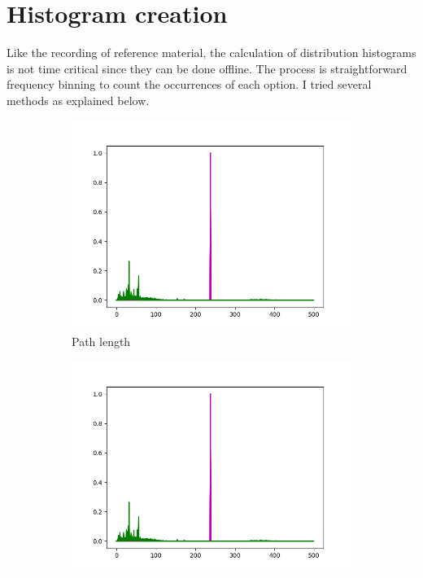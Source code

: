 \documentclass[ %
                    author={Samuel Russell},
                supervisor={Prof. Bogdan Warinschi},
                    degree={MEng},
                     title={Innocuous Ciphertexts},
                  subtitle={The DE-CENSOR Scheme},
                      type={Research},
                      year={2018} ]{dissertation}
\begin{document}
\section{Histogram creation}

Like the recording of reference material, the calculation of distribution histograms is not time critical since they can be done offline. The process is straightforward frequency binning to count the occurrences of each option. I tried several methods as explained below.


\begin{figure}[h]
	\centering
	\begin{subfigure}[b]{0.3\linewidth}
		\includegraphics[width=\linewidth]{bob}
		\caption{Path length}
		\label{fig:length_hist}
	\end{subfigure}
	\begin{subfigure}[b]{0.3\linewidth}
		\includegraphics[width=\linewidth]{bob}

\end{subfigure}
\end{figure}
\end{document}
